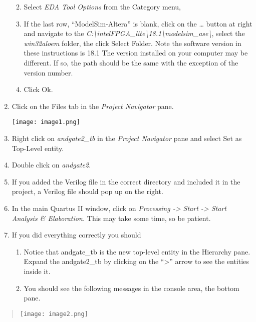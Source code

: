 \begin{enumerate}
  \begin{enumerate}
  \def\labelenumii{\alph{enumii}.}
  \item
    Select \emph{EDA Tool Options} from the Category menu,
  \item
    If the last row, ``ModelSim-Altera'' is blank, click on the \ldots{}
    button at right and navigate to the
    \emph{C:\textbackslash intelFPGA\_lite\textbackslash18.1\textbackslash modelsim\_ase\textbackslash{}},
    select the \emph{win32aloem} folder, the click Select Folder.  Note the software version in these instructions
    is 18.1  The version installed on your computer may be different.  If so, the path should be the same with the
    exception of the version number. 
  \item
    Click Ok.
  \end{enumerate}
\item
  Click on the Files tab in the \emph{Project Navigator} pane.
  
  \texttt{[image: image1.png]}

\item
  Right click on \emph{andgate2\_tb} in the \emph{Project Navigator}
  pane and select Set as Top-Level entity.
\item
  Double click on \emph{andgate2}.
\item
  If you added the Verilog file in the correct directory and included it
  in the project, a Verilog file should pop up on the right.
\item
  In the main Quartus II window, click on \emph{Processing
  -\textgreater{} Start -\textgreater{} Start Analysis \& Elaboration.}
  This may take some time, so be patient.
\item
  If you did everything correctly you should

  \begin{enumerate}
  \def\labelenumii{\alph{enumii}.}
  \item
    Notice that andgate\_tb is the new top-level entity in the Hierarchy
    pane. Expand the andgate2\_tb by clicking on the ``\textgreater''
    arrow to see the entities inside it.
  \item
    You should see the following messages in the console area, the
    bottom pane.
  \end{enumerate}
\end{enumerate}

\begin{quote}
\texttt{[image: image2.png]}
\end{quote}

